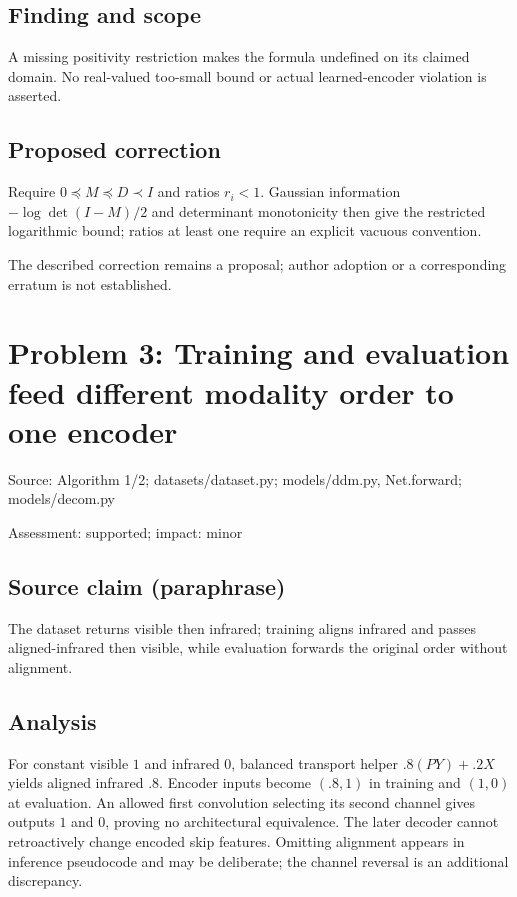 \documentclass[11pt]{article}
\begin{document}
\subsection*{Finding and scope}

A missing positivity restriction makes the formula undefined on its claimed domain. No real-valued too-small bound or actual learned-encoder violation is asserted.

\subsection*{Proposed correction}

Require \(0\preceq M\preceq D\prec I\) and ratios \(r_i<1\). Gaussian information \(-\log\det(I-M)/2\) and determinant monotonicity then give the restricted logarithmic bound; ratios at least one require an explicit vacuous convention.

The described correction remains a proposal; author adoption or a corresponding erratum is not established.

\section*{Problem 3: Training and evaluation feed different modality order to one encoder}

Source: Algorithm 1/2; datasets/dataset.py; models/ddm.py, Net.forward; models/decom.py

Assessment: supported; impact: minor

\subsection*{Source claim (paraphrase)}

The dataset returns visible then infrared; training aligns infrared and passes aligned-infrared then visible, while evaluation forwards the original order without alignment.

\subsection*{Analysis}

For constant visible \(1\) and infrared \(0\), balanced transport helper \(.8(PY)+.2X\) yields aligned infrared \(.8\). Encoder inputs become \((.8,1)\) in training and \((1,0)\) at evaluation. An allowed first convolution selecting its second channel gives outputs \(1\) and \(0\), proving no architectural equivalence. The later decoder cannot retroactively change encoded skip features. Omitting alignment appears in inference pseudocode and may be deliberate; the channel reversal is an additional discrepancy.
\end{document}
